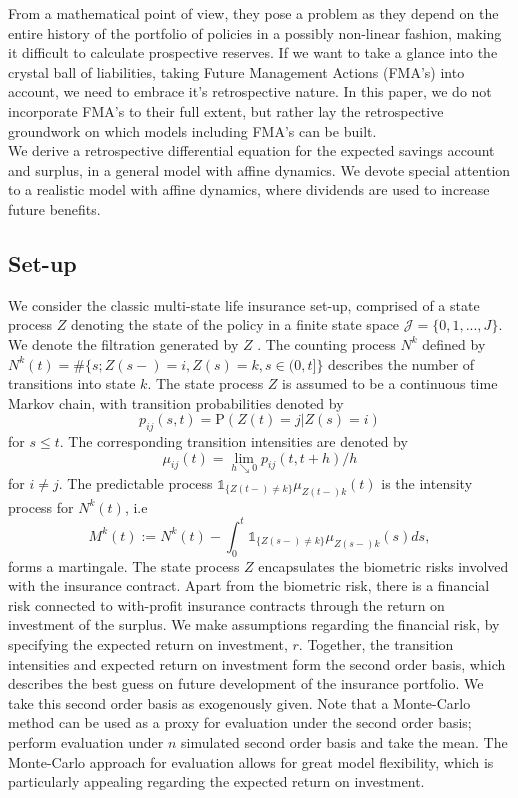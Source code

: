 \documentclass[12pt]{article}
\newcommand{\indic}[1]{\mathds{1}_{ \{ #1 \} }}
\renewcommand{\P}{\text{P}}
\theoremstyle{my_thm}
\begin{document}
From a mathematical point of view, they pose a problem as they depend on the entire history of the portfolio of policies in a possibly non-linear fashion, making it difficult to calculate prospective reserves. If we want to take a glance into the crystal ball of liabilities, taking Future Management Actions (FMA's) into account, we need to embrace it's retrospective nature. In this paper, we do not incorporate FMA's to their full extent, but rather lay the retrospective groundwork on which models including FMA's can be built.
\\[12pt]
We derive a retrospective differential equation for the expected savings account and surplus, in a general model with affine dynamics. We devote special attention to a realistic model with affine dynamics, where dividends are used to increase future benefits. 




\subsection{Set-up}
We consider the classic multi-state life insurance set-up, comprised of a state process $Z$ denoting the state of the policy in a finite state space $\mathcal{J}=\{0,1,...,J\}$. We denote the filtration generated by $Z$  . The counting process $N^{k}$ defined by $N^{k}(t)=\# \{ s; Z(s-)= i, Z(s)=k, s \in (0,t] \}$ describes the number of transitions into state $k$.  The state process $Z$ is assumed to be a continuous time Markov chain, with transition probabilities denoted by
$$
p_{ij}(s,t)= \P(Z(t)=j|Z(s)=i)
$$
for $s\leq t$. The corresponding transition intensities are denoted by
$$
\mu_{ij}(t)=\lim_{h \searrow 0} p_{ij}(t,t+h)/h
$$
for $i \neq j$. The predictable process $ \indic{Z(t-)\neq k }\mu_{Z(t-)k}(t)$ is the intensity process for $N^{k}(t)$, i.e
$$
M^{k}(t):=N^k(t)-\int_0^t \indic{Z(s-)\neq k } \mu_{Z(s-)k}(s) ds,
$$
forms a martingale. The state process $Z$ encapsulates the biometric risks involved with the insurance contract. Apart from the biometric risk, there is a financial risk connected to with-profit insurance contracts through the return on investment of the surplus. We make assumptions regarding the financial risk, by specifying the expected return on investment, $r$. Together, the transition intensities and expected return on investment form the second order basis, which describes the best guess on future development of the insurance portfolio. We take this second order basis as exogenously given. Note that a Monte-Carlo method can be used as a proxy for evaluation under the second order basis; perform evaluation under $n$ simulated second order basis and take the mean. The Monte-Carlo approach for evaluation allows for great model flexibility, which is particularly appealing regarding the expected return on investment. 
\end{document}
